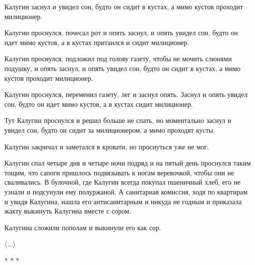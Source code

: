 Калугин заснул и увидел сон, будто он сидит в кустах, а мимо кустов проходит милиционер.

Калугин проснулся, почесал рот и опять заснул, и опять увидел сон, будто он идет мимо кустов, а в кустах притаился и сидит милиционер.

Калугин проснулся, подложил под голову газету, чтобы не мочить слюнями подушку,
и опять заснул, и опять увидел сон, будто он сидит в кустах, а мимо кустов проходит милиционер.

Калугин проснулся, переменил газету, лег и заснул опять.
Заснул и опять увидел сон, будто он идет мимо кустов, а в кустах сидит милиционер.

Тут Калугин проснулся и решил больше не спать, но моментально заснул и увидел
сон, будто он сидит за милиционером, а мимо проходят кусты.

Калугин закричал и заметался в кровати, но проснуться уже не мог.

Калугин спал четыре дня и четыре ночи подряд и на пятый день проснулся таким
тощим, что сапоги пришлось подвязывать к ногам веревочкой, чтобы они не сваливались.
В булочной, где Калугин всегда покупал пшеничный хлеб, его не узнали и подсунули
ему полуржаной. А санитарная комиссия, ходя по квартирам и увидя Калугина,
нашла его антисанитарным и никуда не годным и приказала жакту выкинуть Калугина
вместе с сором.

Калугина сложили пополам и выкинули его как сор.

\begin{flushright}
$\langle\dots\rangle$
\end{flushright}

\begin{center}
* * *
\end{center}
